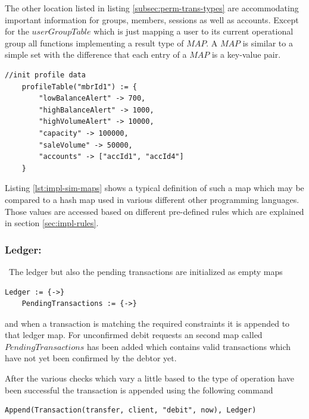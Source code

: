 The other location listed in listing \ref{subsec:perm-trans-types} are accommodating important information for groups, members, sessions as well as accounts. Except for the $userGroupTable$ which is just mapping a user to its current operational group all functions implementing a result type of $MAP$. A $MAP$ is similar to a simple set with the difference that each entry of a $MAP$ is a key-value pair.

\begin{center}
\begin{minipage}{0.8\textwidth}
\small
\begin{lstlisting}[language=bsl_lst,caption={\bf\small $MAP$ example showing a profile table entry},label={lst:impl-sim-maps} ]
	//init profile data
	profileTable("mbrId1") := {
		"lowBalanceAlert" -> 700,
		"highBalanceAlert" -> 1000,		
		"highVolumeAlert" -> 10000,
		"capacity" -> 100000,
		"saleVolume" -> 50000,
		"accounts" -> ["accId1", "accId4"]
	}
\end{lstlisting}
\end{minipage}
\end{center}

Listing \ref{lst:impl-sim-maps} shows a typical definition of such a map which may be compared to a hash map used in various different other programming languages. Those values are accessed based on different pre-defined rules which are explained in section \ref{sec:impl-rules}.

\subsubsection{Ledger: }\ The ledger but also the pending transactions are initialized as empty maps

\begin{lstlisting}[language=bsl]
	Ledger := {->}
	PendingTransactions := {->}
\end{lstlisting}

and when a transaction is matching the required constraints it is appended to that ledger map. For unconfirmed debit requests an second map called $PendingTransactions$ has been added which contains valid transactions which have not yet been confirmed by the debtor yet.

After the various checks which vary a little based to the type of operation have been successful the transaction is appended using the following command 

\begin{lstlisting}[language=bsl]
	Append(Transaction(transfer, client, "debit", now), Ledger)
\end{lstlisting}

